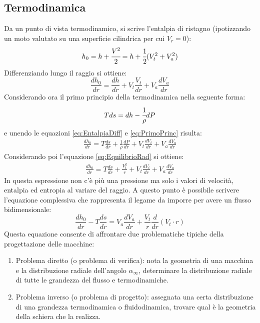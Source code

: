 \subsection{Termodinamica}
Da un punto di vista termodinamico, si scrive l'entalpia di ristagno (ipotizzando un moto valutato su una superficie cilindrica per cui $V_r = 0$):
\begin{align*}
h_0 = h + \cfrac{V^2}{2} = h + \cfrac{1}{2}(V_t^2 + V_a^2)
\end{align*}
Differenziando lungo il raggio si ottiene:
\begin{equation}
\frac{dh_0}{dr} = \frac{dh}{dr} + V_t \frac{V_t}{dr} + V_a \frac{dV_a}{dr}
\label{eq:EntalpiaDiff}
\end{equation}
Considerando ora il primo principio della termodinamica nella seguente forma:
\begin{equation}
Tds = dh - \cfrac{1}{\rho} dP
\label{eq:PrimoPrinc}
\end{equation}
e unendo le equazioni \ref{eq:EntalpiaDiff} e \ref{eq:PrimoPrinc} risulta:
\begin{align*}
\frac{dh_0}{dr} = T \frac{ds}{dr} + \frac{1}{\rho} \frac{dP}{dr} + V_t \frac{dV_t}{dr} + V_a \frac{dV_a}{dr}
\end{align*}
Considerando poi l'equazione \ref{eq:EquilibrioRad} si ottiene:
\begin{align*}
\frac{dh_0}{dr} = T \frac{ds}{dr} + \frac{V_t^2}{r} + V_t \frac{dV_t}{dr} + V_a \frac{dV_a}{dr}
\end{align*}
In questa espressione non c'è più una pressione ma solo i valori di velocità, entalpia ed entropia al variare del raggio. A questo punto è possibile scrivere l'equazione complessiva che rappresenta il legame da imporre per avere un flusso bidimensionale:
\begin{equation}
\boxed{ \frac{dh_0}{dr} - T\frac{ds}{dr} = V_a \frac{dV_a}{dr} + \frac{V_t}{r} \frac{d}{dr}(V_t \cdot r)}
\end{equation}
Questa equazione consente di affrontare due problematiche tipiche della progettazione delle macchine:
\begin{enumerate}
\item Problema diretto (o problema di verifica): nota la geometria di una macchina e la distribuzione radiale dell'angolo $\alpha_{\infty}$, determinare la distribuzione radiale di tutte le grandezza del flusso e termodinamiche.
\item Problema inverso (o problema di progetto): assegnata una certa distribuzione di una grandezza termodinamica o fluidodinamica, trovare qual è la geometria della schiera che la realizza.
\end{enumerate}
